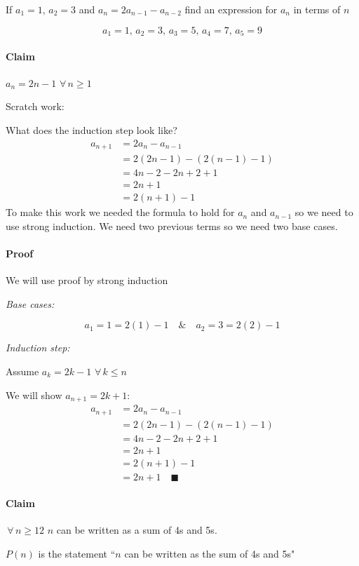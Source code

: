 \documentclass{article}
\newcommand{\A}{\,\forall\,}
\begin{document}
If \(a_1=1,\,a_2=3\) and \(a_n=2a_{n-1}-a_{n-2}\) find an expression for \(a_n\) in terms of \(n\)

\[a_1=1,\,a_2=3,\,a_3=5,\,a_4=7,\,a_5=9\]

\paragraph{Claim} \(a_n=2n-1\,\A n\ge 1\)

\begin{itshape}
Scratch work:

What does the induction step look like?
\begin{align*}
a_{n+1}&=2a_n-a_{n-1}\\
&=2(2n-1)-(2(n-1)-1)\\
&=4n-2-2n+2+1\\
&=2n+1\\
&=2(n+1)-1
\end{align*}
To make this work we needed the formula to hold for \(a_n\) and \(a_{n-1}\) so we need to use strong induction. We need two previous terms so we need two base cases.
\end{itshape}

\paragraph{Proof} We will use proof by strong induction

\emph{Base cases:}

\[a_1=1=2(1)-1\quad\&\quad a_2=3=2(2)-1\]

\emph{Induction step:}

Assume \(a_k=2k-1\,\A k\le n\)

We will show \(a_{n+1}=2k+1\):
\begin{align*}
a_{n+1}&=2a_n-a_{n-1}\\
&=2(2n-1)-(2(n-1)-1)\\
&=4n-2-2n+2+1\\
&=2n+1\\
&=2(n+1)-1\\
&=2n+1\quad\blacksquare
\end{align*}

\paragraph{Claim} \(\A n\ge 12\) \(n\) can be written as a sum of 4s and 5s.

\(P(n)\) is the statement ``\(n\) can be written as the sum of 4s and 5s"
\end{document}
